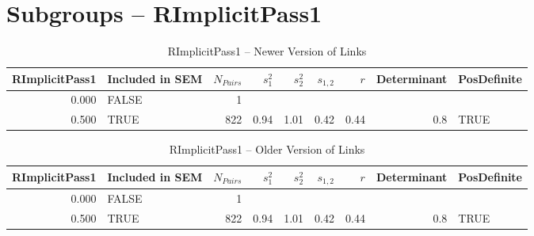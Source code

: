 \documentclass{article}\usepackage[]{graphicx}\usepackage[]{color}
\begin{document}
\section{Subgroups --  RImplicitPass1 }%
\begin{table}[ht]
\centering
\begin{tabular}{rlrrrrrrl}
  \hline
RImplicitPass1 & Included in SEM & $N_{Pairs}$ & $s_1^2$ & $s_2^2$ & $s_{1,2}$ & $r$ & Determinant & PosDefinite \\ 
  \hline
0.000 & FALSE & 1 &  &  &  &  &  &  \\ 
  0.500 & TRUE & 822 & 0.94 & 1.01 & 0.42 & 0.44 & 0.8 & TRUE \\ 
   \hline
\end{tabular}
\caption{RImplicitPass1 -- Newer Version of Links} 
\end{table}
\begin{table}[ht]
\centering
\begin{tabular}{rlrrrrrrl}
  \hline
RImplicitPass1 & Included in SEM & $N_{Pairs}$ & $s_1^2$ & $s_2^2$ & $s_{1,2}$ & $r$ & Determinant & PosDefinite \\ 
  \hline
0.000 & FALSE & 1 &  &  &  &  &  &  \\ 
  0.500 & TRUE & 822 & 0.94 & 1.01 & 0.42 & 0.44 & 0.8 & TRUE \\ 
   \hline
\end{tabular}
\caption{RImplicitPass1 -- Older Version of Links} 
\end{table}
\newpage 
\end{document}
